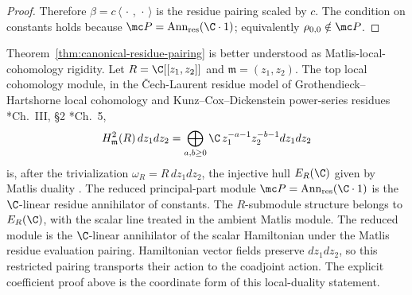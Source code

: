 \documentclass[11pt]{memoir}
\begin{document}
\begin{proof}
  Therefore $\beta=c\,\langle\,\cdot\,,\,\cdot\,\rangle$ is the residue
  pairing scaled by $c$. The condition on constants holds because
  $\mc P=\operatorname{Ann}_{\mathrm{res}}(\C\cdot1)$; equivalently
  $\rho_{0,0}\notin\mc P$.
\end{proof}

\begin{rmk}\label{rmk:residue-pairing-schur}
  Theorem~\ref{thm:canonical-residue-pairing} is better understood as
  Matlis-local-cohomology rigidity. Let
  $R=\C[[z_1,z_2]]$ and $\mathfrak m=(z_1,z_2)$. The top local
  cohomology module, in the \v{C}ech-Laurent residue model of
  Grothendieck--Hartshorne local cohomology and
  Kunz--Cox--Dickenstein power-series residues
  \cite{hartshorne-local-cohomology}*{Ch.~III, \S2}
  \cite{kunz-residues-duality}*{Ch.~5},
  $$H^2_{\mathfrak m}(R)\,dz_1dz_2
    =\bigoplus_{a,b\geq0}\C\,z_1^{-a-1}z_2^{-b-1}dz_1dz_2$$
  is, after the trivialization $\omega_R=R\,dz_1dz_2$, the injective
  hull $E_R(\C)$ given by Matlis duality
  \cite{matlis-injective}. The reduced principal-part module
  $\mc P=\operatorname{Ann}_{\mathrm{res}}(\C\cdot1)$ is the
  $\C$-linear residue annihilator of constants.  The \(R\)-submodule
  structure belongs to \(E_R(\C)\), with the scalar line treated in the
  ambient Matlis module.  The reduced module is the $\C$-linear
  annihilator of
  the scalar Hamiltonian under the Matlis residue evaluation pairing.
  Hamiltonian vector fields preserve $dz_1dz_2$, so this restricted
  pairing transports their action to the coadjoint action. The explicit
  coefficient proof above is the coordinate form of this local-duality
  statement.
\end{rmk}
\end{document}
